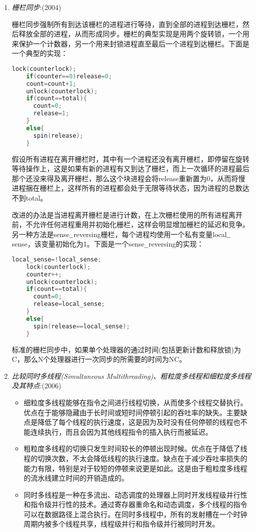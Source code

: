 \documentclass[a4paper]{ctexart}
\newcommand{\li}{\uline{\hspace{0.5em}}}
\begin{document}
\begin{enumerate}
  \item \emph{栅栏同步}:(2004)
  
  栅栏同步强制所有到达该栅栏的进程进行等待，直到全部的进程到达栅栏，然后释放全部的进程，从而形成同步。栅栏的典型实现是用两个旋转锁，一个用来保护一个计数器，另一个用来封锁进程直至最后一个进程到达栅栏。下面是一个典型的实现：
  \begin {lstlisting}[language=C] 
    lock(counterlock);
    if(counter==0)release=0;
    count=count+1;
    unlock(counterlock);
    if(count==total){
      count=0;
      release=1;
    }
    else{
      spin(release);
    }
  \end{lstlisting}
  
  假设所有进程在离开栅栏时，其中有一个进程还没有离开栅栏，即停留在旋转等待操作上，这是如果有新的进程有又到达了栅栏，而上一次循环的进程最后那个还没来得及离开栅栏，那么这个块进程会将release重新置为0，从而将慢进程捆在栅栏上，这样所有的进程都会处于无限等待状态，因为进程的总数达不到total。
  
  改进的办法是当进程离开栅栏是进行计数，在上次栅栏使用的所有进程离开前，不允许任何进程重用并初始化栅栏，这样会明显增加栅栏的延迟和竞争。
  另一种方法是sense$\li$reversing栅栏，每个进程均使用一个私有变量local$\li$sense，该变量初始化为1。下面是一个sense$\li$reversing的实现：
  \begin {lstlisting}[language=c]
    local_sense=!local_sense;
    lock(counterlock);
    counter++;
    unlock(counterlock);
    if(count==total){
      count=0;
      release=local_sense;
    }
    else{
      spin(release==local_sense);
    }
  \end{lstlisting}
  
  标准的栅栏同步中，如果单个处理器的通过时间(包括更新计数和释放锁)为C，那么N个处理器进行一次同步的所需要的时间为NC。
  
  \item \emph{比较同时多线程(Simultaneous Multithreading)、粗粒度多线程和细粒度多线程及其特点}:(2006)
  \begin{itemize}
    \item 细粒度多线程能够在指令之间进行线程切换，从而使多个线程交替执行。优点在于能够隐藏由于长时间或短时间停顿引起的吞吐率的缺失。主要缺点是降低了每个线程的执行速度，这是因为及时没有任何停顿的线程也不能连续执行，而且会因为其他线程指令的插入执行而被延迟。
    \item 粗粒度多线程的切换只发生时间较长的停顿出现时候。优点在于降低了线程的切换次数，不太会降低线程的执行速度。缺点在于减少吞吐率损失的能力有限，特别是对于较短的停顿来说更是如此。这是由于粗粒度多线程的流水线建立时间的开销造成的。
    \item 同时多线程是一种在多流出、动态调度的处理器上同时开发线程级并行性和指令级并行性的技术。通过寄存器重命名和动态调度，多个线程的指令可以在数据路径上混合执行。在同时多线程中，所有的发射槽在一个时钟周期内被多个线程共享，线程级并行和指令级并行被同时开发。
  \end{itemize}
  

\end{enumerate}
\end{document}
